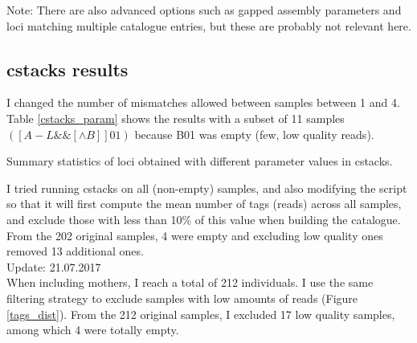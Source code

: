 \documentclass[10pt,a4paper]{report}
\begin{document}
Note: There are also advanced options such as gapped assembly parameters and loci matching multiple catalogue entries, but these are probably not relevant here.
\subsection{cstacks results}

I changed the number of mismatches allowed between samples between 1 and 4. Table \ref{cstacks_param} shows the results with a subset of 11 samples $([A-L\&\&[\wedge B]]01)$ because B01 was empty (few, low quality reads). 

\begin{table}
\begin{center}
\vspace{10px}
\vspace{10px}
\caption{Summary statistics of loci obtained with different parameter values in cstacks.}
\label{cstacks_param}
\end{center}
\end{table}

I tried running cstacks on all (non-empty) samples, and also modifying the script so that it will first compute the mean number of tags (reads) across all samples, and exclude those with less than 10\% of this value when building the catalogue. From the 202 original samples, 4 were empty and excluding low quality ones removed 13 additional ones.\\

Update: 21.07.2017\\
When including mothers, I reach a total of 212 individuals. I use the same filtering strategy to exclude samples with low amounts of reads (Figure \ref{tags_dist}). From the 212 original samples, I excluded 17 low quality samples, among which 4 were totally empty.
\end{document}

